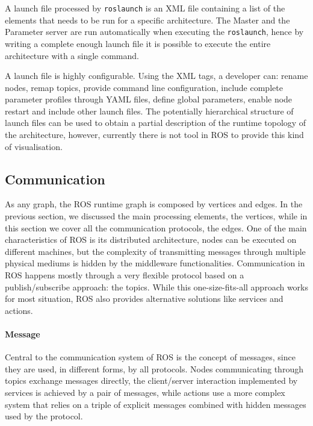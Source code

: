 A launch file processed by \texttt{roslaunch} is an XML file containing a list of the elements that needs to be run for a specific architecture. The Master and the Parameter server are run automatically when executing the \texttt{roslaunch}, hence by writing a complete enough launch file it is possible to execute the entire architecture with a single command.

A launch file is highly configurable. Using the XML tags, a developer can: rename nodes, remap topics, provide command line configuration, include complete parameter profiles through YAML files, define global parameters, enable node restart and include other launch files. The potentially hierarchical structure of launch files can be used to obtain a partial description of the runtime topology of the architecture, however, currently there is not tool in ROS to provide this kind of visualisation.

\subsection{Communication}
As any graph, the ROS runtime graph is composed by vertices and edges. In the previous section, we discussed the main processing elements, the vertices, while in this section we cover all the communication protocols, the edges. One of the main characteristics of ROS is its distributed architecture, nodes can be executed on different machines, but the complexity of transmitting messages through multiple physical mediums is hidden by the middleware functionalities. Communication in ROS happens mostly through a very flexible protocol based on a publish/subscribe approach: the topics. While this one-size-fits-all approach works for most situation, ROS also provides alternative solutions like services and actions.

\paragraph{Message} Central to the communication system of ROS is the concept of messages, since they are used, in different forms, by all protocols. Nodes communicating through topics exchange messages directly, the client/server interaction implemented by services is achieved by a pair of messages, while actions use a more complex system that relies on a triple of explicit messages combined with hidden messages used by the protocol.

